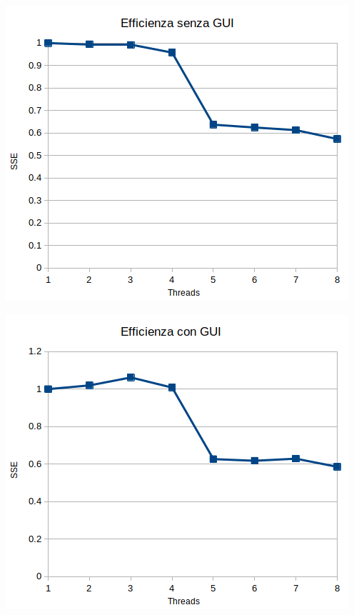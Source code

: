 \documentclass[12pt,a4paper,oneside]{article}
\begin{document}
	\hfill
	\begin{minipage}{.45\textwidth}
		\centering
		\includegraphics[width=\linewidth]{sse-no-gui}
		\label{fig:sse-no-gui}
	\end{minipage}
	\hfill
	\begin{minipage}{.45\textwidth}
		\centering
		\includegraphics[width=\linewidth]{sse-gui}
		\label{fig:sse-gui}
	\end{minipage}
	\hfill
\end{document}

